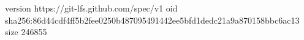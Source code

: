 version https://git-lfs.github.com/spec/v1
oid sha256:86d44cdf4ff5b2fee0250b487095491442ee5bfd1dedc21a9a870158bbc6ac13
size 246855
